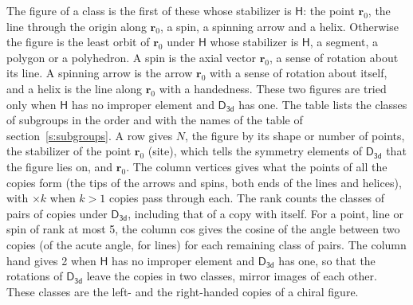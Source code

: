 \documentclass[10pt,a4paper]{article}
\numberwithin{equation}{section}
\newcommand{\grp}[1]{\mathsf{#1}}
\newcommand{\pointr}{\mathbf{r}}
\begin{document}
\leavevmode\label{n:head.figure}The figure of a class is the first of these whose stabilizer is $\grp{H}$: the point $\pointr_0$, the line through the origin along $\pointr_0$, a spin, a spinning arrow and a helix. Otherwise the figure is the least orbit of $\pointr_0$ under $\grp{H}$ whose stabilizer is $\grp{H}$, a segment, a polygon or a polyhedron. A spin is the axial vector $\pointr_0$, a sense of rotation about its line. A spinning arrow is the arrow $\pointr_0$ with a sense of rotation about itself, and a helix is the line along $\pointr_0$ with a handedness. These two figures are tried only when $\grp{H}$ has no improper element and $\grp{D_{3d}}$ has one. The table lists the classes of subgroups in the order and with the names of the table of section~\ref{s:subgroups}. \label{n:head.site}A row gives $N$, the figure by its shape or number of points, the stabilizer of the point $\pointr_0$ (site), which tells the symmetry elements of $\grp{D_{3d}}$ that the figure lies on, and $\pointr_0$. \label{n:head.vertices}The column vertices gives what the points of all the copies form (the tips of the arrows and spins, both ends of the lines and helices), with ${\times}k$ when $k > 1$ copies pass through each. \label{n:head.rank}The rank counts the classes of pairs of copies under $\grp{D_{3d}}$, including that of a copy with itself. \label{n:head.cos}For a point, line or spin of rank at most 5, the column cos gives the cosine of the angle between two copies (of the acute angle, for lines) for each remaining class of pairs. \label{n:head.hand}The column hand gives 2 when $\grp{H}$ has no improper element and $\grp{D_{3d}}$ has one, so that the rotations of $\grp{D_{3d}}$ leave the copies in two classes, mirror images of each other. These classes are the left- and the right-handed copies of a chiral figure.
\end{document}
